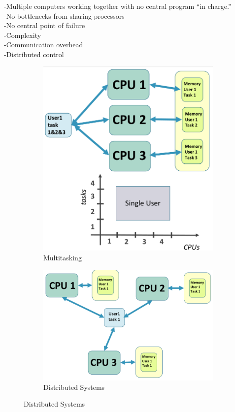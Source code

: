 -Multiple computers
working together with no
central program “in
charge.”\\
-No bottlenecks from
sharing processors\\
-No central point of failure\\
-Complexity\\
-Communication overhead\\
-Distributed control\\


\begin{figure}[ht]
\centering
\begin{subfigure}{.5\textwidth}
  \centering
  \includegraphics[width=.7\textwidth]{figure_parallel/multitasking.png}
  \caption{Multitasking}
\end{subfigure}%
\begin{subfigure}{.5\textwidth}
  \centering
  \includegraphics[width=.9\textwidth]{figure_parallel/distributed_system.png}
  \caption{Distributed Systems}
\end{subfigure}
\end{figure}

